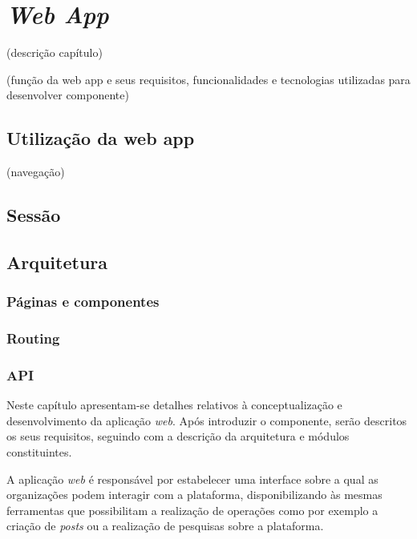 \section{\textit{Web App}}

(descrição capítulo)

(função da web app e seus requisitos, funcionalidades e tecnologias utilizadas para desenvolver componente)

\subsection{Utilização da web app}

(navegação)

\subsection{Sessão}

\subsection{Arquitetura}

\subsubsection{Páginas e componentes}

\subsubsection{Routing}

\subsubsection{API}

\iffalse

Neste capítulo apresentam-se detalhes relativos à conceptualização e desenvolvimento da aplicação \textit{web}. Após introduzir o componente, serão descritos os seus requisitos, seguindo com a descrição da arquitetura e módulos constituintes.

\par \medskip

A aplicação \textit{web} é responsável por estabelecer uma interface sobre a qual as organizações podem interagir com a plataforma, disponibilizando às mesmas ferramentas que possibilitam a realização de operações como por exemplo a criação de \textit{posts} ou a realização de pesquisas sobre a plataforma.

